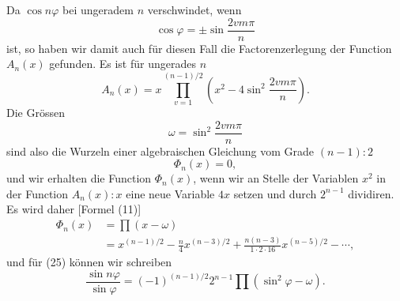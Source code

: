 \documentclass[11pt]{article}
\begin{document}
Da $\cos n\varphi$ bei ungeradem $n$ verschwindet, wenn
\[
        \cos\varphi=\pm\sin\frac{2vm\pi}{n}
\]
ist, so haben wir damit auch für diesen Fall die Factorenzerlegung der Function $A_n(x)$ gefunden. Es ist für ungerades $n$
\[
\tag{26}       A_n(x)=x\prod_{v=1}^{(n-1)/2}
\left(x^2-4\sin^2\frac{2vm\pi}{n}\right).
\]
Die Grössen
\[
\tag{27}       \omega=\sin^2\frac{2vm\pi}{n}
\]
sind also die Wurzeln einer algebraischen Gleichung vom Grade $(n-1):2$
\[
        \Phi_n(x)=0,
\]
und wir erhalten die Function $\Phi_n(x)$, wenn wir an Stelle der Variablen $x^2$ in der Function $A_n(x):x$ eine neue Variable $4x$ setzen und durch $2^{n-1}$ dividiren. Es wird daher [Formel (11)]
\[
\tag{28}\begin{aligned}
\Phi_n(x)&=\prod(x-\omega)\\
&=x^{(n-1)/2}-\frac n4 x^{(n-3)/2}
+\frac{n(n-3)}{1\cdot2\cdot16}x^{(n-5)/2}-\cdots,
\end{aligned}
\]
und für (25) können wir schreiben
\[
\tag{29}       \frac{\sin n\varphi}{\sin\varphi}
=(-1)^{(n-1)/2}2^{n-1}\prod(\sin^2\varphi-\omega).
\]
\end{document}
